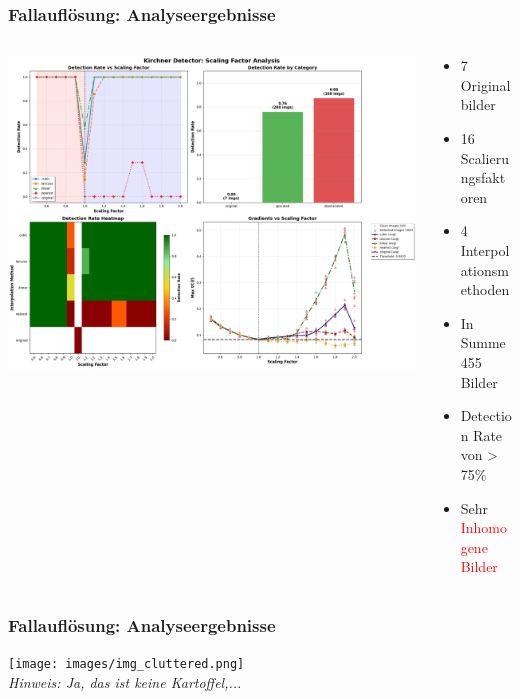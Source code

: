 \documentclass[11pt,t,usepdftitle=false,aspectratio=169]{beamer}
\begin{document}
\begin{frame}
	\frametitle{Fallauflösung: Analyseergebnisse}
	\begin{columns}[T]
		\begin{column}{0.6\textwidth}
			\includegraphics[width=\textwidth]{images/scaling_analysis_report.png}
		\end{column}
		\begin{column}{0.40\textwidth}
			\begin{itemize}
				\item 7 Originalbilder
				\item 16 Scalierungsfaktoren
				\item 4 Interpolationsmethoden
				\item In Summe 455 Bilder
				\item Detection Rate von > 75\%
				\item Sehr \textcolor{red}{Inhomogene Bilder} 
			\end{itemize}
		\end{column}
	\end{columns}
\end{frame}

\begin{frame}
	\frametitle{Fallauflösung: Analyseergebnisse}
	\begin{center}
		\texttt{[image: images/img\_cluttered.png]}\\
		\textit{Hinweis: Ja, das ist keine Kartoffel,...}
	\end{center}
\end{frame}
\end{document}
